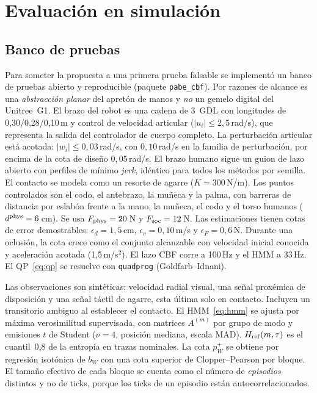 \section{Evaluación en simulación}
\label{sec:sim}

\subsection{Banco de pruebas}
\label{sec:sim:setup}
Para someter la propuesta a una primera prueba falsable se implementó un banco de
pruebas abierto y reproducible (paquete \texttt{pabe\_cbf}). Por razones de alcance es
una \emph{abstracción planar} del apretón de manos y \emph{no} un gemelo digital del
Unitree~G1. El brazo del robot es una cadena de 3~GDL con longitudes de 0{,}30/0{,}28/0{,}10\,m y control
de velocidad articular ($|u_i|\le 2{,}5$\,rad/s), que representa la salida del
controlador de cuerpo completo. La perturbación articular está acotada:
$|w_i|\le 0{,}03$\,rad/s, con $0{,}10$\,rad/s en la familia de perturbación, por encima de la cota de
diseño $0{,}05$\,rad/s. El brazo humano sigue un guion de lazo abierto
con perfiles de mínimo \emph{jerk}, idéntico para todos los métodos por semilla. El
contacto se modela como un resorte de agarre ($K=300$\,N/m). Los puntos controlados son
el codo, el antebrazo, la muñeca y la palma, con barreras de distancia por eslabón frente a la
mano, la muñeca, el codo y el torso humanos ($d^{\rm phys}=6$\,cm). Se usa $F_{\rm phys}=20$\,N y
$F_{\rm soc}=12$\,N. Las estimaciones tienen cotas de error demostrables:
$\epsilon_d=1{,}5$\,cm, $\epsilon_v=0{,}10$\,m/s y $\epsilon_F=0{,}6$\,N. Durante una oclusión,
la cota crece como el conjunto alcanzable con velocidad inicial conocida y
aceleración acotada (1{,}5\,m/s$^2$). El lazo CBF corre a 100\,Hz y el HMM a
33\,Hz. El QP~\eqref{eq:qp} se resuelve con \texttt{quadprog} (Goldfarb--Idnani).

Las observaciones son sintéticas: velocidad radial visual, una señal proxémica de
disposición y una señal táctil de agarre, esta última solo en contacto. Incluyen un transitorio
ambiguo al establecer el contacto. El HMM~\eqref{eq:hmm} se ajusta por máxima
verosimilitud supervisada, con matrices $A^{(m)}$ por grupo de modo y emisiones $t$ de
Student ($\nu=4$, posición mediana, escala MAD). $H_{\rm ref}(m,\tau)$ es el
cuantil~0{,}8 de la entropía en trazas nominales. La cota $p_W^+$ se obtiene por
regresión isotónica de $b_W$ con una cota superior de Clopper--Pearson por bloque. El
tamaño efectivo de cada bloque se cuenta como el número de \emph{episodios} distintos y no de
ticks, porque los ticks de un episodio están autocorrelacionados.

